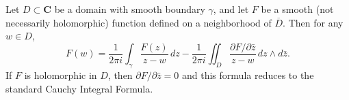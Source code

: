 Let $D \subset \mathbf{C}$ be a domain with smooth boundary $\gamma$, and let $F$ be a smooth (not necessarily holomorphic) function defined on a neighborhood of $\overline{D}$. Then for any $w \in D$,
$$F(w) = \frac{1}{2\pi i} \int_{\gamma} \frac{F(z)}{z - w} \, dz - \frac{1}{2\pi i} \iint_D \frac{\partial F / \partial \bar{z}}{z - w} \, dz \wedge d\bar{z}.$$
If $F$ is holomorphic in $D$, then $\partial F / \partial \bar{z} = 0$ and this formula reduces to the standard Cauchy Integral Formula.
